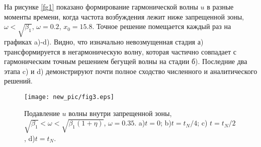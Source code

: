 На рисунке \ref{fg1} показано формирование гармонической волны $ u $ в разные моменты времени, когда частота возбуждения лежит ниже запрещенной зоны, $ \omega <\sqrt {\beta_1} $, $ \omega = 0.2 $, $ x_0 = 15.8 $. Точное решение помещается каждый раз на графиках a)-d). Видно, что изначально невозмущенная стадия а) трансформируется в негармоническую волну, которая частично совпадает с гармоническим точным решением бегущей волны на стадии б). Последние два этапа c) и d) демонстрируют почти полное сходство численного и аналитического решений.
\begin{figure*}
\begin{center}
\texttt{[image: new\_pic/fig3.eps]}
\end{center}
\caption{Подавление $ u $ волны внутри запрещенной зоны, $\sqrt{\beta_1}<\omega<\sqrt{\beta_1(1+\eta)}$, $\omega=0.35$. a)$t=0$; b)$ t=t_N/4$; c) $t=t_N/2$, d)$t=t_N$.}
\label{fg3}
\end{figure*}
  
